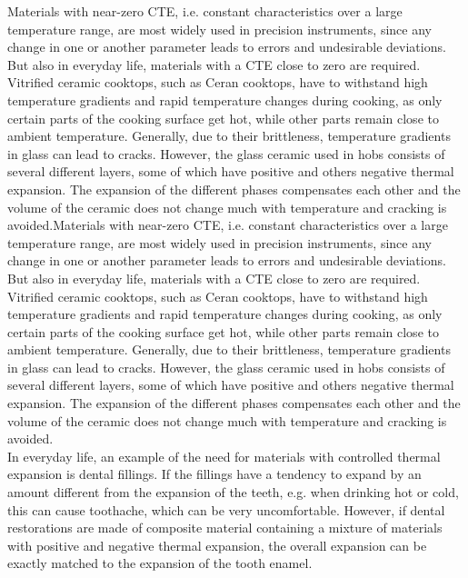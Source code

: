 \documentclass[12pt, a4paper, twocolumn]{article}
\begin{document}
Materials with near-zero CTE, i.e. constant characteristics over a large temperature range, are most widely used in precision instruments, since any change in one or another parameter leads to errors and undesirable deviations. But also in everyday life, materials with a CTE close to zero are required. Vitrified ceramic cooktops, such as Ceran cooktops, have to withstand high temperature gradients and rapid temperature changes during cooking, as only certain parts of the cooking surface get hot, while other parts remain close to ambient temperature. Generally, due to their brittleness, temperature gradients in glass can lead to cracks. However, the glass ceramic used in hobs consists of several different layers, some of which have positive and others negative thermal expansion. The expansion of the different phases compensates each other and the volume of the ceramic does not change much with temperature and cracking is avoided.Materials with near-zero CTE, i.e. constant characteristics over a large temperature range, are most widely used in precision instruments, since any change in one or another parameter leads to errors and undesirable deviations. But also in everyday life, materials with a CTE close to zero are required. Vitrified ceramic cooktops, such as Ceran cooktops, have to withstand high temperature gradients and rapid temperature changes during cooking, as only certain parts of the cooking surface get hot, while other parts remain close to ambient temperature. Generally, due to their brittleness, temperature gradients in glass can lead to cracks. However, the glass ceramic used in hobs consists of several different layers, some of which have positive and others negative thermal expansion. The expansion of the different phases compensates each other and the volume of the ceramic does not change much with temperature and cracking is avoided.\\ 

In everyday life, an example of the need for materials with controlled thermal expansion is dental fillings. If the fillings have a tendency to expand by an amount different from the expansion of the teeth, e.g. when drinking hot or cold, this can cause toothache, which can be very uncomfortable. However, if dental restorations are made of composite material containing a mixture of materials with positive and negative thermal expansion, the overall expansion can be exactly matched to the expansion of the tooth enamel.

\end{document}
